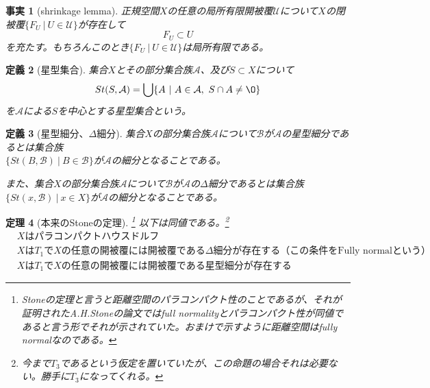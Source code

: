 \documentclass[leqno]{jsarticle}
\newtheorem{thm}{定理}
\newtheorem{df}[thm]{定義}
\newtheorem{fact}[thm]{事実}
\begin{document}
\begin{fact}[shrinkage lemma]\label{normal}
正規空間$X$の任意の局所有限開被覆$\mathcal{U}$について$X$の閉被覆$\{F_U\ |\ U\in \mathcal{U}\}$が存在して
\[
F_U\subset U
\]
を充たす。もちろんこのとき$\{F_U\ |\ U\in \mathcal{U}\}$は局所有限である。
\end{fact}
\begin{df}[星型集合]
集合$X$とその部分集合族$\mathcal{A}$、及び$S\subset X$について
\[
St(S,\mathcal{A})=\bigcup\{A\ |\ A\in \mathcal{A},\ S\cap A\neq\O\}
\]
を$\mathcal{A}$による$S$を中心とする星型集合という。
\end{df}
\begin{df}[星型細分、$\Delta$細分]
集合$X$の部分集合族$\mathcal{A}$について$\mathcal{B}$が$\mathcal{A}$の星型細分であるとは集合族\\$\{St(B,\mathcal{B})\ |\ B\in \mathcal{B}\}$が$\mathcal{A}$の細分となることである。\par
また、集合$X$の部分集合族$\mathcal{A}$について$\mathcal{B}$が$\mathcal{A}$の$\Delta$細分であるとは集合族$\{St(x,\mathcal{B})\ |\ x\in X\}$が$\mathcal{A}$の細分となることである。
\end{df}
\setcounter{equation}{0}
\begin{thm}[本来のStoneの定理]\label{stone}\footnote{Stoneの定理と言うと距離空間のパラコンパクト性のことであるが、それが証明されたA.H.Stoneの論文\cite{stone}ではfull normalityとパラコンパクト性が同値であると言う形でそれが示されていた。おまけで示すように距離空間はfully normalなのである。}
以下は同値である。\footnote{今まで$T_3$であるという仮定を置いていたが、この命題の場合それは必要ない。勝手に$T_3$になってくれる。}
\begin{align}
&\mbox{$X$はパラコンパクトハウスドルフ}\\
&\mbox{$X$は$T_1$で$X$の任意の開被覆には開被覆である$\Delta$細分が存在する（この条件をFully normalという）}\\
&\mbox{$X$は$T_1$で$X$の任意の開被覆には開被覆である星型細分が存在する}
\end{align}
\end{thm}
\end{document}
